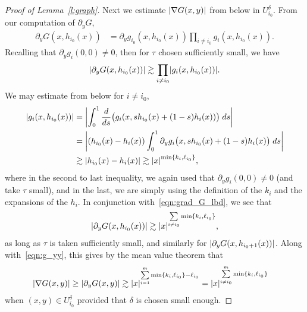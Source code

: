 \documentclass[AHL,Unicode,longabstracts,published]{cedram}
\newcommand{\abs}[1]{\left \lvert #1 \right \rvert}
\let\originalleft\left
\let\originalright\right
\renewcommand{\left}{\mathopen{}\mathclose\bgroup\originalleft}
\renewcommand{\right}{\aftergroup\egroup\originalright}
\begin{document}
\begin{proof}[Proof of Lemma~\ref{l:graph}]
Next we estimate $\abs{\nabla G(x,y)}$ from below in $U_{i_0}^\delta$. From our computation of $\partial_y G$,
\begin{align*}
\partial_y G(x, h_{i_0}(x)) & = \partial_y g_{i_0}(x, h_{i_0}(x)) \prod_{i \ne i_0} g_i(x, h_{i_0}(x)).
\end{align*}
Recalling that $\partial_y g_i(0,0) \ne 0$, then for $ \tau$ chosen sufficiently small, we have
\begin{align}
\abs{ \partial_y G(x, h_{i_0}(x))} \gtrsim \prod_{i \ne i_0} \abs{g_i(x, h_{i_0}(x))}. \label{eqn:grad_G_lbd}
\end{align}
We may estimate from below for $i \ne i_0$,
\begin{equation}\label{eqn:gi_lbd}
\begin{aligned}[t]
\abs{g_i(x, h_{i_0}(x))} & = \abs{\int_0^1 \frac{d}{ds} \bigl(g_i(x, sh_{i_0}(x) + (1-s) h_i(x)) \bigr) \; ds } \\
& = \abs{\left(h_{i_0}(x) - h_i(x) \right) \int_0^1 \partial_y g_i\bigl(x, sh_{i_0}(x) + (1-s) h_i(x)\bigr) \; ds} \\
& \gtrsim \abs{h_{i_0}(x) - h_i(x)} \gtrsim \abs{x}^{\min\{ k_i, \ell_{i_0}\}},
\end{aligned}
\end{equation}
where in the second to last inequality, we again used that $\partial_y g_i(0,0) \ne 0$ (and take $\tau$ small), and in the last, we are simply using the definition of the $k_i$ and the expansions of the $h_i$. In conjunction with~\eqref{eqn:grad_G_lbd}, we see that
\begin{align*}
\abs{\partial_y G(x, h_{i_0}(x))} \gtrsim \abs{x}^{\sum\limits_{i \ne i_0} \min \{k_i, \ell_{i_0} \}},
\end{align*}
as long as $\tau$ is taken sufficiently small, and similarly for $\abs{\partial_y G(x, h_{i_0+1}(x))}$. Along with~\eqref{eqn:g_yy}, this gives by the mean value theorem that
\begin{equation}\label{eqn:grad_G_lbd2}
\begin{split}
\abs{\nabla G(x, y)} \ge \abs{\partial_y G(x,y)} & \gtrsim \abs{x}^{\sum\limits_{i =1}^m \min \{k_i, \ell_{i_0} \} - \ell_{i_0}} = \abs{x}^{\sum\limits_{i \ne i_0}^m \min \{k_i, \ell_{i_0} \}}
\end{split}
\end{equation}
when $(x,y) \in U_{i_0}^\delta$ provided that $\delta$ is chosen small enough.


\end{proof}
\end{document}
